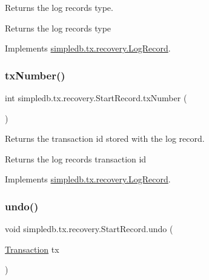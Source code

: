 Returns the log record\textquotesingle{}s type. \begin{DoxyReturn}{Returns}
the log record\textquotesingle{}s type 
\end{DoxyReturn}


Implements \hyperlink{interfacesimpledb_1_1tx_1_1recovery_1_1LogRecord_aa97a8907de4709c2b3596e8c9709a26c}{simpledb.\+tx.\+recovery.\+Log\+Record}.

\mbox{\label{classsimpledb_1_1tx_1_1recovery_1_1StartRecord_ae6680c3904f3a0734c2a8656ed58b706}} 
\subsubsection{\texorpdfstring{tx\+Number()}{txNumber()}}
{\footnotesize\ttfamily int simpledb.\+tx.\+recovery.\+Start\+Record.\+tx\+Number (\begin{DoxyParamCaption}{ }\end{DoxyParamCaption})\hspace{0.3cm}{\ttfamily [inline]}}

Returns the transaction id stored with the log record. \begin{DoxyReturn}{Returns}
the log record\textquotesingle{}s transaction id 
\end{DoxyReturn}


Implements \hyperlink{interfacesimpledb_1_1tx_1_1recovery_1_1LogRecord_a167f7406c18bf3367f1b83f6853870db}{simpledb.\+tx.\+recovery.\+Log\+Record}.

\mbox{\label{classsimpledb_1_1tx_1_1recovery_1_1StartRecord_af33d26ca2032ba63cc06f266e9c41efa}} 
\subsubsection{\texorpdfstring{undo()}{undo()}}
{\footnotesize\ttfamily void simpledb.\+tx.\+recovery.\+Start\+Record.\+undo (\begin{DoxyParamCaption}\item[{\hyperlink{classsimpledb_1_1tx_1_1Transaction}{Transaction}}]{tx }\end{DoxyParamCaption})\hspace{0.3cm}{\ttfamily [inline]}}

